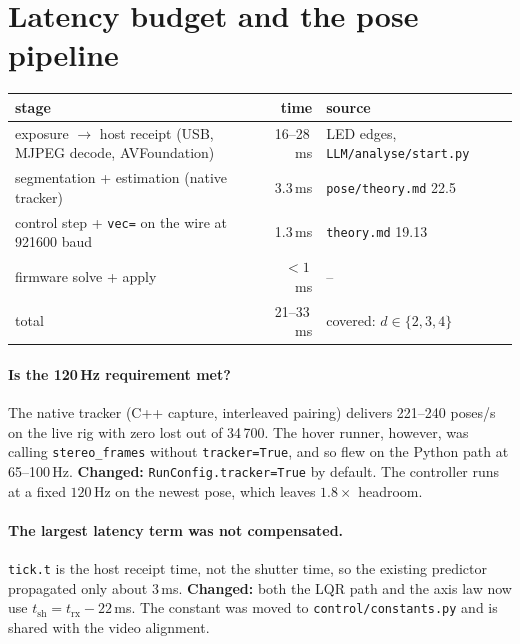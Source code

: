\documentclass[11pt]{article}
\begin{document}
\section{Latency budget and the pose pipeline}
\label{sec:pose}
\begin{center}\begin{tabular}{lrl}
\toprule
stage & time & source \\ \midrule
exposure $\to$ host receipt (USB, MJPEG decode, AVFoundation) & 16--28\,ms & LED edges, \texttt{LLM/analyse/start.py} \\
segmentation + estimation (native tracker) & 3.3\,ms & \texttt{pose/theory.md} 22.5 \\
control step + \texttt{vec=} on the wire at 921600 baud & 1.3\,ms & \texttt{theory.md} 19.13 \\
firmware solve + apply & $<1$\,ms & -- \\ \midrule
total & 21--33\,ms & covered: $d\in\{2,3,4\}$ \\
\bottomrule
\end{tabular}\end{center}

\paragraph{Is the 120\,Hz requirement met?} The native tracker (C++ capture, interleaved pairing)
delivers 221--240 poses/s on the live rig with zero lost out of 34\,700. The hover runner, however,
was calling \texttt{stereo\_frames} without \texttt{tracker=True}, and so flew on the Python path at
65--100\,Hz. \textbf{Changed:} \texttt{RunConfig.tracker=True} by default. The controller runs at a fixed
$120$\,Hz on the newest pose, which leaves $1.8\times$ headroom.

\paragraph{The largest latency term was not compensated.} \texttt{tick.t} is the host receipt time,
not the shutter time, so the existing predictor propagated only about 3\,ms. \textbf{Changed:} both the
LQR path and the axis law now use $t_{\mathrm{sh}}=t_{\mathrm{rx}}-22$\,ms. The constant was moved to
\texttt{control/constants.py} and is shared with the video alignment.
\end{document}
